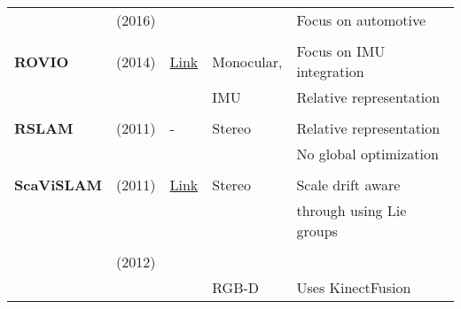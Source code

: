 \documentclass[a4paper,12pt]{scrartcl}
\begin{document}
{\begin{longtable}{l|l|l|l|l}
                           & \cite{Buczko2016a} (2016)         &                                                                    &                       & Focus on automotive\\
                           &                                   &                                                                    &                       &\\
    \textbf{ROVIO}         & \cite{Bloesch2015} (2014)         & {\href{https://github.com/ethz-asl/rovio}{Link}}                   & Monocular,            & Focus on IMU integration\\
                           &                                   &                                                                    & IMU                   & Relative representation\\
                           &                                   &                                                                    &                       &\\
    \textbf{RSLAM}         & \cite{Mei2011} (2011)             & -                                                                  & Stereo                & Relative representation\\
                           &                                   &                                                                    &                       & No global optimization \\
                           &                                   &                                                                    &                       &\\
    \textbf{ScaViSLAM}     & \cite{Strasdat2011} (2011)        & {\href{https://github.com/strasdat/ScaViSLAM}{Link}}               & Stereo                & Scale drift aware\\
                           &                                   &                                                                    &                       & through using Lie groups\\
                           &                                   &                                                                    &                       &\\
                           & \cite{Milford2012} (2012)         &                                                                    &                       &\\
                           &                                   &                                                                    & RGB-D                 & Uses KinectFusion\\

\end{longtable}}
\end{document}
